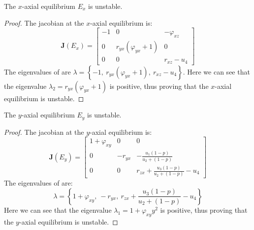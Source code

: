 \begin{theorem}\label{thm:axial-x-stability}
    The $x$-axial equilibrium $E_x$ is unstable.
\end{theorem}
\begin{proof}
    The jacobian at the $x$-axial equilibrium is:
    \begin{equation}\label{matrix:jacobian-axial-x}
        \textbf{J}\left(E_x\right) = \begin{bmatrix}
            -1 & 0 & -\varphi_{xz}\\
            0 & r_{yx}\left(\varphi_{yx}+1\right) & 0\\
            0 & 0 & r_{xz}-u_4
        \end{bmatrix}
    \end{equation}
    The eigenvalues of  are $\lambda=\left\{-1,\ r_{yx}\left(\varphi_{yx}+1\right),\ r_{xz}-u_4\right\}$. Here we can see that the eigenvalue $\lambda_2=r_{yx}\left(\varphi_{yx}+1\right)$ is positive, thus proving that the $x$-axial equilibrium is unstable.
\end{proof}

\begin{theorem}\label{thm:axial-y-stability}
    The $y$-axial equilibrium $E_y$ is unstable.
\end{theorem}
\begin{proof}
    The jacobian at the $y$-axial equilibrium is:
    \begin{equation}\label{matrix:jacobian-axial-y}
        \textbf{J}\left(E_y\right) = \begin{bmatrix}
            1+\varphi_{xy} & 0 & 0\\
            0 & -r_{yx} & -\frac{u_1\left(1-p\right)}{u_2+\left(1-p\right)}\\
            0 & 0 & r_{zx}+\frac{u_3\left(1-p\right)}{u_2+\left(1-p\right)}-u_4
        \end{bmatrix}
    \end{equation}
    The eigenvalues of  are:
    \begin{equation*}
        \lambda=\left\{1+\varphi_{xy},\ -r_{yx},\ r_{zx}+\frac{u_3\left(1-p\right)}{u_2+\left(1-p\right)}-u_4\right\}
    \end{equation*}
    Here we can see that the eigenvalue $\lambda_1=1+\varphi_{xy}y^2$ is positive, thus proving that the $y$-axial equilibrium is unstable.
\end{proof}

